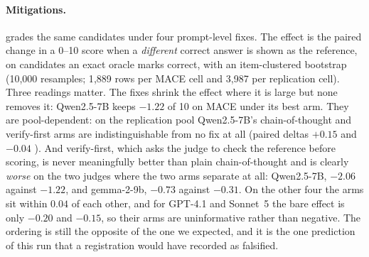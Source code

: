 \paragraph{Mitigations.}
 grades the same candidates under four prompt-level fixes. The effect is the
paired change in a 0--10 score when a \emph{different} correct answer is shown as the reference,
on candidates an exact oracle marks correct, with an item-clustered bootstrap (10{,}000 resamples;
1{,}889 rows per \textsc{MACE} cell and 3{,}987 per replication cell). Three readings matter. The
fixes shrink the effect where it is large but none removes it: Qwen2.5-7B keeps $-1.22$ of 10 on
\textsc{MACE} under its best arm. They are pool-dependent: on the replication pool Qwen2.5-7B's
chain-of-thought and verify-first arms are indistinguishable from no fix at all (paired deltas
$+0.15$  and $-0.04$ ). And verify-first, which asks the judge to
check the reference before scoring, is never meaningfully better than plain chain-of-thought and is
clearly \emph{worse} on the two judges where the two arms separate at all: Qwen2.5-7B, $-2.06$
against $-1.22$, and gemma-2-9b, $-0.73$ against $-0.31$. On the other four the arms sit within
$0.04$ of each other, and for GPT-4.1 and Sonnet~5 the bare effect is only $-0.20$ and $-0.15$, so
their arms are uninformative rather than negative. The ordering is still the opposite of the one we
expected, and it is the one prediction of this run that a registration would have recorded as
falsified.

